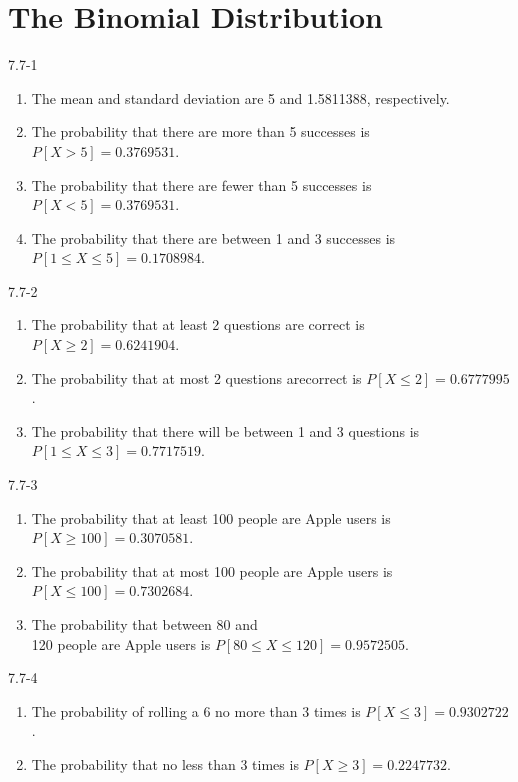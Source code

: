 \setcounter{chapter}{7}\chapter{The Binomial Distribution}
\begin{exsol@solution}{7.7-1}

		\begin{enumerate}
	  \item The mean and standard deviation are 5 and 1.5811388, respectively.
    \item The probability that there are more than 5 successes is $P[ X > 5 ] = 0.3769531$.
    \item The probability that there are fewer than 5 successes is $P[ X < 5 ] = 0.3769531$.
    \item The probability that there  are between 1 and 3 successes  is $P[ 1 \le X \le 5 ] = 0.1708984$.
	  \end{enumerate}
\end{exsol@solution}
\begin{exsol@solution}{7.7-2}

\begin{enumerate}
\item The probability that at least 2 questions are correct is $P[X \ge 2] = 0.6241904$.
\item The probability that at most 2 questions arecorrect is $P[X \le 2] = 0.6777995$.
\item The probability that there  will be between 1 and 3 questions is $P[1 \le X \le 3] = 0.7717519$.
\end{enumerate}
\end{exsol@solution}
\begin{exsol@solution}{7.7-3}

\begin{enumerate}
\item The probability that at least 100 people are Apple users is $P[X \ge 100] = 0.3070581$.
\item The probability that at most 100 people are Apple users is $P[X \le 100] = 0.7302684$.
\item The probability that between 80 and \\ 120 people are Apple users is $P[ 80 \le X \le 120] = 0.9572505$.
\end{enumerate}
\end{exsol@solution}
\begin{exsol@solution}{7.7-4}


\begin{enumerate}
\item The probability of rolling a 6 no more than 3 times is $P[X \le 3] = 0.9302722$.
\item The probability that no less than 3 times is $P[X \ge 3] = 0.2247732$.
\end{enumerate}
\end{exsol@solution}

